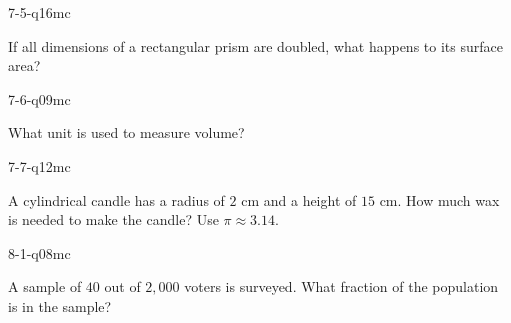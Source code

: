 \begin{practiceQuestion}{7-5-q16}{mc}
\begin{questionText}
If all dimensions of a rectangular prism are doubled, what happens to its surface area?
\end{questionText}
\end{practiceQuestion}

\begin{practiceQuestion}{7-6-q09}{mc}
\begin{questionText}
What unit is used to measure volume?
\end{questionText}
\end{practiceQuestion}

\begin{practiceQuestion}{7-7-q12}{mc}
\begin{questionText}
A cylindrical candle has a radius of $2$ cm and a height of $15$ cm. How much wax is needed to make the candle? Use $\pi \approx 3.14$.
\end{questionText}
\end{practiceQuestion}

\begin{practiceQuestion}{8-1-q08}{mc}
\begin{questionText}
A sample of $40$ out of $2{,}000$ voters is surveyed. What fraction of the population is in the sample?
\end{questionText}
\end{practiceQuestion}

